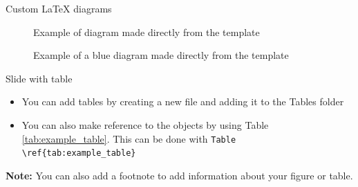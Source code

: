 \begin{frame}{Custom LaTeX diagrams}
\vspace{1cm}

  \begin{figure}
    \centering
    \caption{Example of diagram made directly from the template}
    \label{fig:example_diagram_magenta}
  \end{figure}

  \begin{figure}
    \centering
    \caption{Example of a blue diagram made directly from the template}
    \label{fig:example_diagram_magenta}
  \end{figure}

  
\end{frame}




\begin{frame}[fragile]{Slide with table}

\scriptsize
\begin{itemize}
    \item You can add tables by creating a new file and adding it to the Tables folder
    \item You can also make reference to the objects by using Table \ref{tab:example_table}. This can be done with \verb|Table \ref{tab:example_table}|
\end{itemize}
\pause
\vspace{-0.5cm}
\begin{table}[!ht]
\begin{scriptsize}
\centering
\caption{Table example}
\scriptsize
{}

\label{tab:example_table}
\end{scriptsize}
\end{table}
\vspace{0.5em}
\raggedright
\scriptsize
\textbf{Note:} You can also add a footnote to add information about your figure or table.

\end{frame}

